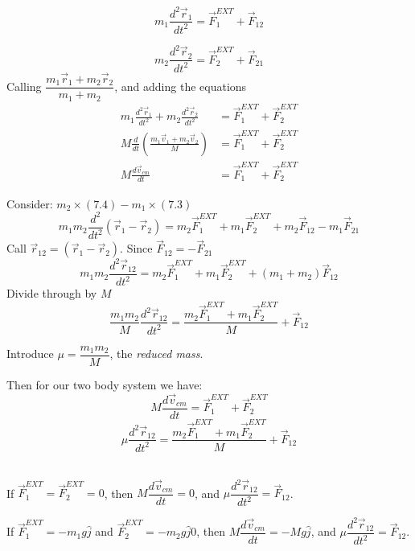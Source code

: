 \begin{equation}
m_1\frac{d^2\vec{r}_1}{dt^2} = \vec{F}_1^{EXT} + \vec{F}_{12}	
\end{equation}

\begin{equation}
m_2\frac{d^2\vec{r}_2}{dt^2} = \vec{F}_2^{EXT} + \vec{F}_{21}	
\end{equation}
Calling $\dfrac{m_1\vec{r}_1 + m_2\vec{r}_2}{m_1 + m_2}$, and adding the equations
\setlength{\jot}{10pt}
\[\begin{aligned}m_1\frac{d^2\vec{r}_1}{dt^2} + m_2\frac{d^2\vec{r}_2}{dt^2} &= \vec{F}_1^{EXT} + \vec{F}_{2}^{EXT}\\
M \frac{d}{dt}\left(\frac{m_1\vec{v}_1 + m_2\vec{v}_2}{M}\right) &=  \vec{F}_1^{EXT} + \vec{F}_{2}^{EXT}\\
M\frac{d\vec{v}_{cm}}{dt} &=  \vec{F}_1^{EXT} + \vec{F}_{2}^{EXT}
\end{aligned}\]

Consider: $m_2 \times (7.4) - m_1\times(7.3)$
\[m_1m_2\frac{d^2}{dt^2}(\vec{r}_1-\vec{r}_2) = m_2\vec{F}_1^{EXT} + m_1\vec{F}_2^{EXT} + m_2\vec{F}_{12} - m_1\vec{F}_{21}\]
Call $\vec{r}_{12} = (\vec{r}_1 - \vec{r}_2)$. Since $\vec{F}_{12} = -\vec{F}_{21}$
\[m_1m_2\frac{d^2\vec{r}_{12}}{dt^2} = m_2\vec{F}_1^{EXT} + m_1\vec{F}_2^{EXT} + (m_1 + m_2)\vec{F}_{12}\]
Divide through by $M$
\[\frac{m_1m_2}{M}\frac{d^2\vec{r}_{12}}{dt^2} = \frac{m_2\vec{F}_1^{EXT} + m_1\vec{F}_2^{EXT}}{M} + \vec{F}_{12}\]
\begin{definition} Introduce $\mu = \dfrac{m_1m_2}{M}$, the \emph{reduced mass}.
\end{definition}
Then for our two body system we have:
\begin{equation}
M\frac{d\vec{v}_{cm}}{dt} =  \vec{F}_1^{EXT} + \vec{F}_{2}^{EXT}
\end{equation}
\begin{equation}
\mu\frac{d^2\vec{r}_{12}}{dt^2} = \frac{m_2\vec{F}_1^{EXT} + m_1\vec{F}_2^{EXT}}{M} + \vec{F}_{12}
\end{equation}~

If $\vec{F}_1^{EXT} = \vec{F}^{EXT}_2 = 0$, then $M\dfrac{d\vec{v}_{cm}}{dt} = 0$, and $\mu\dfrac{d^2\vec{r}_{12}}{dt^2}  = \vec{F}_{12}$.

If $\vec{F}_1^{EXT} = -m_1g\hat{j}$ and $\vec{F}^{EXT}_2 = -m_2g\hat{j}0$, then $M\dfrac{d\vec{v}_{cm}}{dt} = -Mg\hat{j}$, and $\mu\dfrac{d^2\vec{r}_{12}}{dt^2}  = \vec{F}_{12}$.



